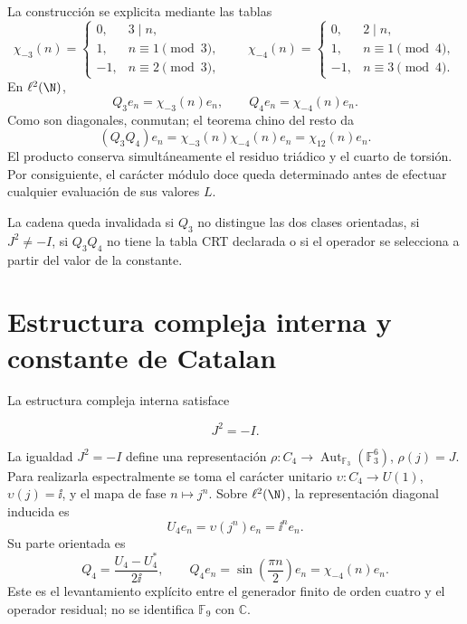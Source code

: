 La construcci\'on se explicita mediante las tablas
\begin{equation}
\chi_{-3}(n)=
\begin{cases}
0,&3\mid n,\\
1,&n\equiv1\pmod3,\\
-1,&n\equiv2\pmod3,
\end{cases}
\qquad
\chi_{-4}(n)=
\begin{cases}
0,&2\mid n,\\
1,&n\equiv1\pmod4,\\
-1,&n\equiv3\pmod4.
\end{cases}
\label{eq:characters34-tables}
\end{equation}
En \(\ell^2(\N)\),
\[
Q_3e_n=\chi_{-3}(n)e_n,
\qquad Q_4e_n=\chi_{-4}(n)e_n.
\]
Como son diagonales, conmutan; el teorema chino del resto da
\begin{equation}
(Q_3Q_4)e_n=\chi_{-3}(n)\chi_{-4}(n)e_n
=\chi_{12}(n)e_n.
\label{eq:q12-product-proof}
\end{equation}
El producto conserva simult\'aneamente el residuo tri\'adico y el cuarto de
torsi\'on. Por consiguiente, el car\'acter m\'odulo doce queda determinado
antes de efectuar cualquier evaluaci\'on de sus valores \(L\).

\begin{remark}
La cadena queda invalidada si \(Q_3\) no distingue las dos clases orientadas,
si \(J^2\ne-I\), si \(Q_3Q_4\) no tiene la tabla CRT declarada o si el
operador se selecciona a partir del valor de la constante.
\end{remark}

\section{Estructura compleja interna y constante de Catalan}

La estructura compleja interna satisface

\begin{equation}
J^2=-I.
\label{eq:J-square}
\end{equation}

La igualdad \(J^2=-I\) define una representaci\'on
\(\rho:C_4\to\operatorname{Aut}_{\mathbb F_3}(\mathbb F_3^6)\),
\(\rho(j)=J\). Para realizarla espectralmente se toma el car\'acter unitario
\(\upsilon:C_4\to U(1)\), \(\upsilon(j)=\ii\), y el mapa de fase
\(n\mapsto j^n\). Sobre \(\ell^2(\N)\), la representaci\'on diagonal inducida
es
\[
U_4e_n=\upsilon(j^n)e_n=\ii^ne_n.
\]
Su parte orientada es
\[
Q_4=\frac{U_4-U_4^*}{2\ii},\qquad
Q_4e_n=\sin\!\left(\frac{\pi n}{2}\right)e_n
=\chi_{-4}(n)e_n.
\]
Este es el levantamiento expl\'icito entre el generador finito de orden cuatro y el operador
residual; no se identifica \(\mathbb F_9\) con \(\mathbb C\).

